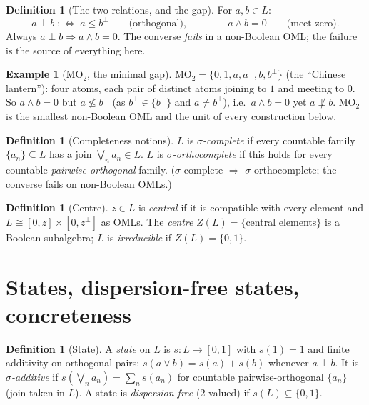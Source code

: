 \documentclass[11pt]{article}
\theoremstyle{definition}
\newtheorem{definition}[theorem]{Definition}
\newtheorem{example}[theorem]{Example}
\theoremstyle{remark}
\newcommand{\MOO}{\mathrm{MO}_2}
\begin{document}
\begin{definition}[The two relations, and the gap]\label{def:gap}
For $a,b\in L$:
\[
  a\perp b \;:\Longleftrightarrow\; a\le b^{\perp}
  \qquad\text{(orthogonal)},\qquad\qquad
  a\wedge b = 0
  \qquad\text{(meet-zero)}.
\]
Always $a\perp b \Rightarrow a\wedge b=0$. The converse \emph{fails} in a
non-Boolean OML; the failure is the source of everything here.
\end{definition}

\begin{example}[$\MOO$, the minimal gap]\label{ex:mo2}
$\MOO=\{0,1,a,a^{\perp},b,b^{\perp}\}$ (the ``Chinese lantern''): four atoms,
each pair of distinct atoms joining to $1$ and meeting to $0$. So
$a\wedge b=0$ but $a\not\le b^{\perp}$ (as $b^{\perp}\in\{b^{\perp}\}$ and
$a\neq b^{\perp}$), i.e.\ $a\wedge b=0$ yet $a\not\perp b$. $\MOO$ is the smallest
non-Boolean OML and the unit of every construction below.
\end{example}

\begin{definition}[Completeness notions]\label{def:complete}
$L$ is \emph{$\sigma$-complete} if every countable family $\{a_n\}\subseteq L$ has
a join $\bigvee_n a_n\in L$. $L$ is \emph{$\sigma$-orthocomplete} if this holds for
every countable \emph{pairwise-orthogonal} family. ($\sigma$-complete $\Rightarrow$
$\sigma$-orthocomplete; the converse fails on non-Boolean OMLs.)
\end{definition}

\begin{definition}[Centre]\label{def:centre}
$z\in L$ is \emph{central} if it is compatible with every element and $L\cong
[0,z]\times[0,z^{\perp}]$ as OMLs. The \emph{centre} $Z(L)=\{$central elements$\}$
is a Boolean subalgebra; $L$ is \emph{irreducible} if $Z(L)=\{0,1\}$.
\end{definition}

\section{States, dispersion-free states, concreteness}

\begin{definition}[State]\label{def:state}
A \emph{state} on $L$ is $s\colon L\to[0,1]$ with $s(1)=1$ and finite additivity on
orthogonal pairs: $s(a\vee b)=s(a)+s(b)$ whenever $a\perp b$. It is
\emph{$\sigma$-additive} if $s(\bigvee_n a_n)=\sum_n s(a_n)$ for countable
pairwise-orthogonal $\{a_n\}$ (join taken in $L$). A state is \emph{dispersion-free}
(2-valued) if $s(L)\subseteq\{0,1\}$.
\end{definition}
\end{document}
